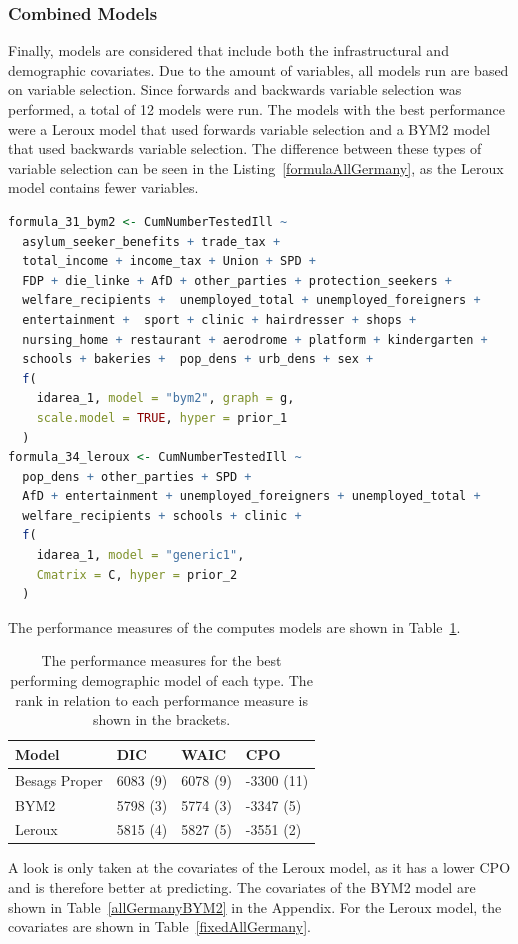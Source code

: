 \subsubsection{Combined Models}
Finally, models are considered that include both the infrastructural and demographic covariates. Due to the amount of variables, all models run are based on variable selection. Since forwards and backwards variable selection was performed, a total of 12 models were run. The models with the best performance were a Leroux model that used forwards variable selection and a BYM2 model that used backwards variable selection. The difference between these types of variable selection can be seen in the Listing~\ref{formulaAllGermany}, as the Leroux model contains fewer variables.
\begin{lstlisting}[caption={The formulas for the best models containing all variables.}, label={formulaAllGermany}, language=R]
formula_31_bym2 <- CumNumberTestedIll ~
  asylum_seeker_benefits + trade_tax + 
  total_income + income_tax + Union + SPD + 
  FDP + die_linke + AfD + other_parties + protection_seekers +
  welfare_recipients +  unemployed_total + unemployed_foreigners +
  entertainment +  sport + clinic + hairdresser + shops +
  nursing_home + restaurant + aerodrome + platform + kindergarten +
  schools + bakeries +  pop_dens + urb_dens + sex +
  f(
    idarea_1, model = "bym2", graph = g,
    scale.model = TRUE, hyper = prior_1
  )
formula_34_leroux <- CumNumberTestedIll ~ 
  pop_dens + other_parties + SPD + 
  AfD + entertainment + unemployed_foreigners + unemployed_total + 
  welfare_recipients + schools + clinic +
  f(
    idarea_1, model = "generic1",
    Cmatrix = C, hyper = prior_2
  )
\end{lstlisting}
The performance measures of the computes models are shown in Table~\ref{allGermany}.
\begin{table}[H] 
\caption{The performance measures for the best performing demographic model of each type. The rank in relation to each performance measure is shown in the brackets. \label{allGermany}}
\begin{tabular}{l l l l}
\toprule
\textbf{Model}	& \textbf{DIC}	& \textbf{WAIC} & \textbf{CPO} \\
\midrule
Besags Proper & 6083 (9) & 6078 (9) & -3300 (11)\\
BYM2 & 5798 (3) & 5774 (3) & -3347 (5)\\
Leroux & 5815 (4) & 5827 (5) & -3551 (2) \\
\bottomrule
\end{tabular}
\end{table}
A look is only taken at the covariates of the Leroux model, as it has a lower CPO and is therefore better at predicting. The covariates of the BYM2 model are shown in Table~\ref{allGermanyBYM2} in the Appendix. For the Leroux model, the covariates are shown in Table~\ref{fixedAllGermany}.

